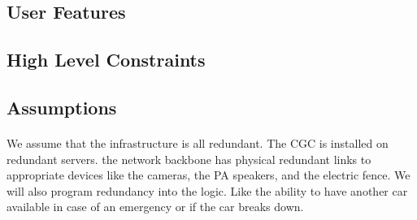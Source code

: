 \documentclass[12pt]{article}
\begin{document}
		\paragraph{} 
		
		\paragraph{} 
		
		\paragraph{} 

	\subsection{User Features}
		\paragraph{} 
		
		\paragraph{} 
		
		\paragraph{} 
	
	\subsection{High Level Constraints}
		\paragraph{}

	\subsection{Assumptions}
		\paragraph{} We assume that the infrastructure is all redundant. The CGC is installed on redundant servers. 
		the network backbone has physical redundant links to appropriate devices like the cameras, the PA speakers, and the electric fence. We will also
		program redundancy into the logic. Like the ability to have another car available in case of an emergency or if the car breaks down.
		
\end{document}
